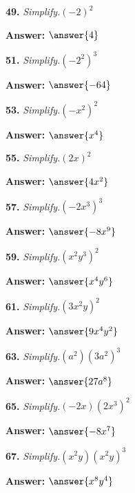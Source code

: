 \documentclass{ximera}
\begin{document}
\begin{problem}
\textbf{49.} \emph{Simplify.}\quad $(-2)^2$

\textbf{Answer:} $\answer{4}$
\end{problem}

\begin{problem}
\textbf{51.} \emph{Simplify.}\quad $(-2^2)^3$

\textbf{Answer:} $\answer{-64}$
\end{problem}

\begin{problem}
\textbf{53.} \emph{Simplify.}\quad $(-x^2)^2$

\textbf{Answer:} $\answer{x^4}$
\end{problem}

\begin{problem}
\textbf{55.} \emph{Simplify.}\quad $(2x)^2$

\textbf{Answer:} $\answer{4x^2}$
\end{problem}

\begin{problem}
\textbf{57.} \emph{Simplify.}\quad $(-2x^3)^3$

\textbf{Answer:} $\answer{-8x^9}$
\end{problem}

\begin{problem}
\textbf{59.} \emph{Simplify.}\quad $(x^2y^3)^2$

\textbf{Answer:} $\answer{x^4y^6}$
\end{problem}

\begin{problem}
\textbf{61.} \emph{Simplify.}\quad $(3x^2y)^2$

\textbf{Answer:} $\answer{9x^4y^2}$
\end{problem}

\begin{problem}
\textbf{63.} \emph{Simplify.}\quad $(a^2)(3a^2)^3$

\textbf{Answer:} $\answer{27a^8}$
\end{problem}

\begin{problem}
\textbf{65.} \emph{Simplify.}\quad $(-2x)(2x^3)^2$

\textbf{Answer:} $\answer{-8x^7}$
\end{problem}

\begin{problem}
\textbf{67.} \emph{Simplify.}\quad $(x^2y)(x^2y)^3$

\textbf{Answer:} $\answer{x^8y^4}$
\end{problem}
\end{document}
